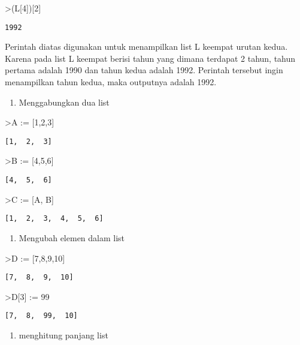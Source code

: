 \documentclass[
]{book}
\providecommand{\tightlist}{%
  \setlength{\itemsep}{0pt}\setlength{\parskip}{0pt}}
\begin{document}
\textgreater(L{[}4{]}){[}2{]}

\begin{verbatim}
1992
\end{verbatim}

Perintah diatas digunakan untuk menampilkan list L keempat urutan kedua. Karena pada list L keempat berisi tahun yang dimana terdapat 2 tahun, tahun pertama adalah 1990 dan tahun kedua adalah 1992. Perintah tersebut ingin menampilkan tahun kedua, maka outputnya adalah 1992.

\begin{enumerate}
\def\labelenumi{\arabic{enumi}.}
\setcounter{enumi}{1}
\tightlist
\item
  Menggabungkan dua list
\end{enumerate}

\textgreater A := {[}1,2,3{]}

\begin{verbatim}
[1,  2,  3]
\end{verbatim}

\textgreater B := {[}4,5,6{]}

\begin{verbatim}
[4,  5,  6]
\end{verbatim}

\textgreater C := {[}A, B{]}

\begin{verbatim}
[1,  2,  3,  4,  5,  6]
\end{verbatim}

\begin{enumerate}
\def\labelenumi{\arabic{enumi}.}
\setcounter{enumi}{2}
\tightlist
\item
  Mengubah elemen dalam list
\end{enumerate}

\textgreater D := {[}7,8,9,10{]}

\begin{verbatim}
[7,  8,  9,  10]
\end{verbatim}

\textgreater D{[}3{]} := 99

\begin{verbatim}
[7,  8,  99,  10]
\end{verbatim}

\begin{enumerate}
\def\labelenumi{\arabic{enumi}.}
\setcounter{enumi}{3}
\tightlist
\item
  menghitung panjang list
\end{enumerate}
\end{document}
